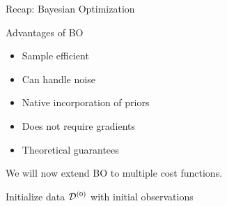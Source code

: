 \begin{frame}[allowframebreaks]{Recap: Bayesian Optimization}

\begin{block}{Advantages of BO}
\begin{itemize}
  \item Sample efficient
  \item Can handle noise
  \item Native incorporation of priors
  \item Does not require gradients
  \item Theoretical guarantees
\end{itemize}
\end{block}

We will now extend BO to multiple cost functions.

\framebreak

\begin{center}
\begin{minipage}{0.75\textwidth}
\begin{algorithm}[H]
    \setcounter{AlgoLine}{0}


	Initialize data $\iter[0]{\dataset}$ with initial observations\;%

    \For{$\bocount=1$ \KwTo $\bobudget$}{
		Fit predictive model $\iter[\bocount]{\surro}$ on $\iter[\bocount-1]{\dataset}$\;

		Select next query point: $\bonextsample \in \argmax_{\conf \in \pcs} \acq(\conf; \iter[\bocount-1]{\dataset}, \iter[\bocount]{\surro})$\;

		Query $\bonextobs$\;

		Update data: $\iter[\bocount]{\dataset} \leftarrow \iter[\bocount-1]{\dataset} \cup \{\langle \bonextsample, \bonextobs \rangle \}$\;
	}
	\caption*{Bayesian optimization loop}
\end{algorithm}
\end{minipage}
\end{center}
\end{frame}


